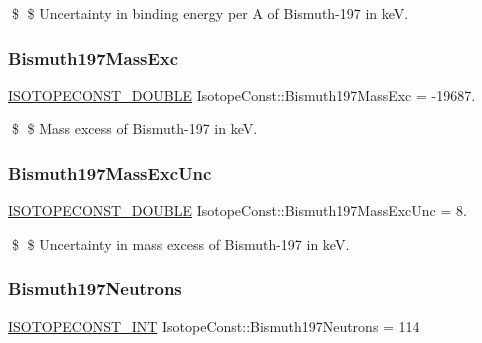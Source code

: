 \$ \$ Uncertainty in binding energy per A of Bismuth-\/197 in keV. \mbox{\label{group___isotope_const-_bismuth-_bi197_gae4ae60c610d5c522bf2c95854b62862d}} 
\subsubsection{\texorpdfstring{Bismuth197\+Mass\+Exc}{Bismuth197MassExc}}
{\footnotesize\ttfamily \mbox{\hyperlink{group___isotope_const-_macros_ga8f45a7272ce02c0b4c65c44636ed719a}{I\+S\+O\+T\+O\+P\+E\+C\+O\+N\+S\+T\+\_\+\+D\+O\+U\+B\+LE}} Isotope\+Const\+::\+Bismuth197\+Mass\+Exc = -\/19687.}

\$ \$ Mass excess of Bismuth-\/197 in keV. \mbox{\label{group___isotope_const-_bismuth-_bi197_ga8b1110154f1a7c740185ba84a0a55e56}} 
\subsubsection{\texorpdfstring{Bismuth197\+Mass\+Exc\+Unc}{Bismuth197MassExcUnc}}
{\footnotesize\ttfamily \mbox{\hyperlink{group___isotope_const-_macros_ga8f45a7272ce02c0b4c65c44636ed719a}{I\+S\+O\+T\+O\+P\+E\+C\+O\+N\+S\+T\+\_\+\+D\+O\+U\+B\+LE}} Isotope\+Const\+::\+Bismuth197\+Mass\+Exc\+Unc = 8.}

\$ \$ Uncertainty in mass excess of Bismuth-\/197 in keV. \mbox{\label{group___isotope_const-_bismuth-_bi197_ga238ed89ef56392241da8a0a46a1e0366}} 
\subsubsection{\texorpdfstring{Bismuth197\+Neutrons}{Bismuth197Neutrons}}
{\footnotesize\ttfamily \mbox{\hyperlink{group___isotope_const-_macros_ga5f18360b3e99483a35c32d789e62621c}{I\+S\+O\+T\+O\+P\+E\+C\+O\+N\+S\+T\+\_\+\+I\+NT}} Isotope\+Const\+::\+Bismuth197\+Neutrons = 114}

